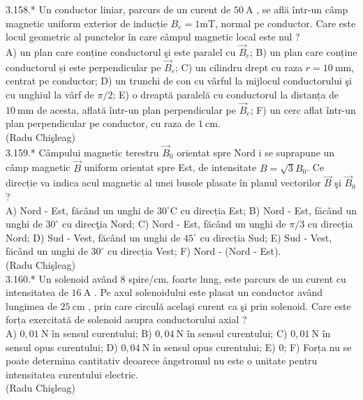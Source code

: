 \documentclass[10pt]{article}
\begin{document}
3.158.* Un conductor liniar, parcurs de un curent de $50 \mathrm{~A}$ , se află într-un câmp magnetic uniform exterior de inducție $B_{e}=1 \mathrm{mT}$, normal pe conductor. Care este locul geometric al punctelor în care câmpul magnetic local este nul ?\\ A) un plan care conține conductorul şi este paralel cu $\vec{B}_{e}$; B) un plan care conține conductorul și este perpendicular pe $\vec{B}_{e}$; C) un cilindru drept cu raza $r=10 \mathrm{~mm}$, centrat pe conductor; D) un trunchi de con cu vârful la mijlocul conductorului şi cu unghiul la vârf de $\pi / 2$; E) o dreaptă paralelă cu conductorul la distanța de $10 \mathrm{~mm}$ de acesta, aflată într-un plan perpendicular pe $\vec{B}_{e}$; F) un cerc aflat într-un plan perpendicular pe conductor, cu raza de $1 \mathrm{~cm}$.\\ (Radu Chişleag)\\

3.159.* Câmpului magnetic terestru $\vec{B}_{0}$ orientat spre Nord i se suprapune un câmp magnetic $\vec{B}$ uniform orientat spre Est, de intensitate $B=\sqrt{3} B_{0}$. Ce direcție va indica acul magnetic al unei busole plasate în planul vectorilor $\vec{B}$ şi $\vec{B}_{0}$ ?\\ A) Nord - Est, făcând un unghi de $30^{\circ} \mathrm{C}$ cu direcția Est; B) Nord - Est, fåcând un unghi de $30^{\circ}$ cu direcţia Nord; C) Nord - Est, făcând un unghi de $\pi / 3$ cu direcția Nord; D) Sud - Vest, făcând un unghi de $45^{\circ}$ cu direcția Sud; E) Sud - Vest, făcând un unghi de $30^{\circ}$ cu direcția Vest; F) Nord - (Nord - Est).\\ (Radu Chişleag)\\

3.160.* Un solenoid având $8$ spire/$\mathrm{cm}$, foarte lung, este parcurs de un curent cu intensitatea de $16 \mathrm{~A}$ . Pe axul solenoidului este plasat un conductor având lungimea de $25 \mathrm{~cm}$ , prin care circulă acelaşi curent ca şi prin solenoid. Care este forța exercitată de solenoid asupra conductorului axial ?\\ A) $0,01 \mathrm{~N}$ în sensul curentului; B) $0,04 \mathrm{~N}$ în sensul curentului; C) $0,01 \mathrm{~N}$ în sensul opus curentului; D) $0,04 \mathrm{~N}$ în sensul opus curentului; E) 0; F) Forța nu se poate determina cantitativ deoarece ångstromul nu este o unitate pentru intensitatea curentului electric.\\ (Radu Chişleag)\\
\end{document}
